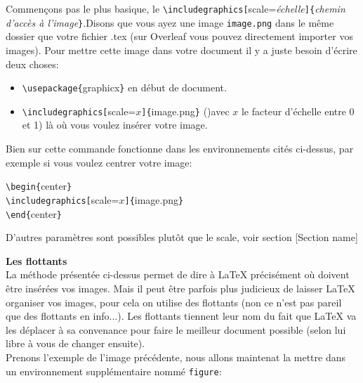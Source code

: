 \documentclass[11pt]{article}				%
\newcommand{\cmdo}[3][]{\texttt{\textbackslash #2}\texttt{[}#1\texttt{]\{}#3\texttt{\}}}
\newcommand{\cmd}[2]{\texttt{\textbackslash #1}\texttt{\{}#2\texttt{\}}}
\begin{document}
Commençons pas le plus basique, le \cmdo[scale=\textit{échelle}]{includegraphics}{\textit{chemin d'accès à l'image}}.Disons que vous ayez une image \texttt{image.png} dans le même dossier que votre fichier .tex (sur Overleaf vous pouvez directement importer vos images). Pour mettre cette image dans votre document il y a juste besoin d'écrire deux choses: \\

\begin{itemize}
	\item \cmd{usepackage}{graphicx} en début de document.
	\item \cmdo[scale=$x$]{includegraphics}{image.png} \quad ()avec $x$ le facteur d'échelle entre 0 et 1) là où vous voulez insérer votre image.
\end{itemize}
\clearpage

Bien sur cette commande fonctionne dans les environnements cités ci-dessus, par exemple si vous voulez centrer votre image: \\


\begin{multicols}{2}
\cmd{begin}{center}\\
\cmdo[scale=$x$]{includegraphics}{image.png} \\
\cmd{end}{center}\\

\columnbreak

D'autres paramètres sont possibles plutôt que le scale, voir section [Section name]
\end{multicols}


\textbf{Les flottants}\\

La méthode présentée ci-dessus permet de dire à LaTeX précisément où doivent être insérées vos images. Mais il peut être parfois plus judicieux de laisser LaTeX organiser vos images, pour cela on utilise des flottants (non ce n'est pas pareil que des flottants en info...). Les flottants tiennent leur nom du fait que LaTeX va les déplacer à sa convenance pour faire le meilleur document possible (selon lui libre à vous de changer ensuite).\\

Prenons l'exemple de l'image précédente, nous allons maintenat la mettre dans un environnement supplémentaire nommé \texttt{figure}: \\
\end{document}
